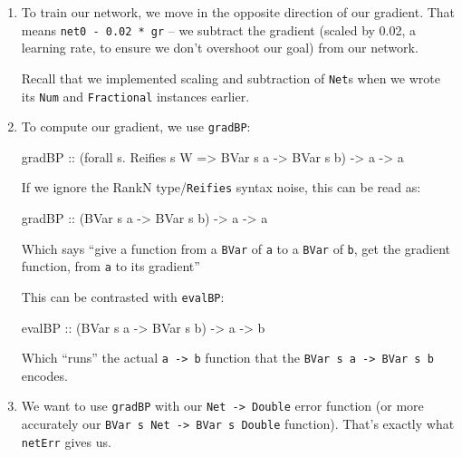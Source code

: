 \documentclass[]{article}
\newenvironment{Shaded}{}{}
\newcommand{\DataTypeTok}[1]{\textcolor[rgb]{0.56,0.13,0.00}{#1}}
\newcommand{\FunctionTok}[1]{\textcolor[rgb]{0.02,0.16,0.49}{#1}}
\newcommand{\NormalTok}[1]{#1}
\newcommand{\OtherTok}[1]{\textcolor[rgb]{0.00,0.44,0.13}{#1}}
\begin{document}
\begin{enumerate}
\def\labelenumi{\arabic{enumi}.}
\item
  To train our network, we move in the opposite direction of our gradient. That
  means \texttt{net0\ -\ 0.02\ *\ gr} -- we subtract the gradient (scaled by
  0.02, a learning rate, to ensure we don't overshoot our goal) from our
  network.

  Recall that we implemented scaling and subtraction of \texttt{Net}s when we
  wrote its \texttt{Num} and \texttt{Fractional} instances earlier.
\item
  To compute our gradient, we use \texttt{gradBP}:

\begin{Shaded}
\begin{Highlighting}[]
\OtherTok{gradBP ::}\NormalTok{ (forall s}\FunctionTok{.} \DataTypeTok{Reifies}\NormalTok{ s }\DataTypeTok{W} \OtherTok{=>} \DataTypeTok{BVar}\NormalTok{ s a }\OtherTok{->} \DataTypeTok{BVar}\NormalTok{ s b) }\OtherTok{->}\NormalTok{ a }\OtherTok{->}\NormalTok{ a}
\end{Highlighting}
\end{Shaded}

  If we ignore the RankN type/\texttt{Reifies} syntax noise, this can be read
  as:

\begin{Shaded}
\begin{Highlighting}[]
\OtherTok{gradBP ::}\NormalTok{ (}\DataTypeTok{BVar}\NormalTok{ s a }\OtherTok{->} \DataTypeTok{BVar}\NormalTok{ s b) }\OtherTok{->}\NormalTok{ a }\OtherTok{->}\NormalTok{ a}
\end{Highlighting}
\end{Shaded}

  Which says ``give a function from a \texttt{BVar} of \texttt{a} to a
  \texttt{BVar} of \texttt{b}, get the gradient function, from \texttt{a} to its
  gradient''

  This can be contrasted with \texttt{evalBP}:

\begin{Shaded}
\begin{Highlighting}[]
\OtherTok{evalBP ::}\NormalTok{ (}\DataTypeTok{BVar}\NormalTok{ s a }\OtherTok{->} \DataTypeTok{BVar}\NormalTok{ s b) }\OtherTok{->}\NormalTok{ a }\OtherTok{->}\NormalTok{ b}
\end{Highlighting}
\end{Shaded}

  Which ``runs'' the actual \texttt{a\ -\textgreater{}\ b} function that the
  \texttt{BVar\ s\ a\ -\textgreater{}\ BVar\ s\ b} encodes.
\item
  We want to use \texttt{gradBP} with our \texttt{Net\ -\textgreater{}\ Double}
  error function (or more accurately our
  \texttt{BVar\ s\ Net\ -\textgreater{}\ BVar\ s\ Double} function). That's
  exactly what \texttt{netErr} gives us.


\end{enumerate}
\end{document}

